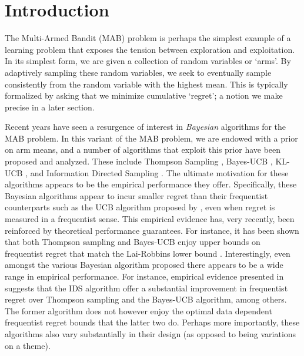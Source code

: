 \section{Introduction} \label{sec:intro}


The Multi-Armed Bandit (MAB) problem is perhaps the simplest example of a learning problem that exposes the tension between exploration and exploitation. In its simplest form, we are given a collection of random variables or `arms'. By adaptively sampling these random variables, we seek to eventually sample consistently from the random variable with the highest mean. This is typically formalized by asking that we minimize cumulative `regret'; a notion we make precise in a later section. 

Recent years have seen a resurgence of interest in {\em Bayesian} algorithms for the MAB problem. In this variant of the MAB problem, we are endowed with a prior on arm means, and a number of algorithms that exploit this prior have been proposed and analyzed. These include Thompson Sampling \citep{thompson1933likelihood}, Bayes-UCB \citep{kaufmann2012thompson}, KL-UCB \citep{garivier2011kl}, and Information Directed Sampling \citep{russo2014learning}. The ultimate motivation for these algorithms appears to be the empirical performance they offer. Specifically, these Bayesian algorithms appear to incur smaller regret than their frequentist counterparts such as the UCB algorithm proposed by \cite{auer2002finite}, even when regret is measured in a frequentist sense. This empirical evidence has, very recently, been reinforced by theoretical performance guarantees. For instance, it has been shown that both Thompson sampling and Bayes-UCB enjoy upper bounds on frequentist regret that match the Lai-Robbins lower bound \citep{lai1985asymptotically}. Interestingly, even amongst the various Bayesian algorithm proposed there appears to be a wide range in empirical performance. For instance, empirical evidence presented in \cite{russo2014learning} suggests that the IDS algorithm offer a substantial improvement in frequentist regret over Thompson sampling and the Bayes-UCB algorithm, among others. The former algorithm does not however enjoy the optimal data dependent frequentist regret bounds that the latter two do. Perhaps more importantly, these algorithms also vary substantially in their design (as opposed to being variations on a theme).    

